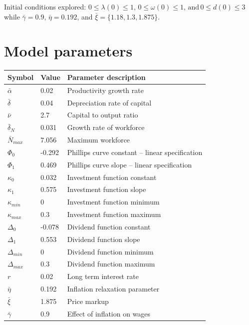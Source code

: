 \documentclass{article}[12 pt]
\begin{document}


Initial conditions explored: $0 \leq \lambda(0) \leq 1, \, 0 \leq \omega(0) \leq 1, \, \text{and} \, 0 \leq d(0) \leq 3$ while $\bar \gamma =0.9$, $\bar \eta = 0.192$, and $\bar \xi = \{ 1.18, 1.3, 1.875\}$.



\section{Model parameters}
\begin{tabular}{ l l l } 
\hline
Symbol & Value & Parameter description \\
\hline
$\bar \alpha$ & 0.02 & Productivity growth rate  \\ 
$\bar \delta$ & 0.04 & Depreciation rate of capital \\
$\bar \nu$ & 2.7  & Capital to output ratio \\
$\bar \delta_N $ & 0.031 & Growth rate of workforce\\
$ \bar N_{max} $ & 7.056 & Maximum workforce \\
$\Phi_0$ & -0.292 & Phillips curve constant -- linear specification \\
$\Phi_1$ & 0.469 & Phillips curve slope -- linear specification \\
$\kappa_0$ & 0.032 & Investment function constant \\
$\kappa_1$ & 0.575 & Investment  function slope \\
$\kappa_{min}$ & 0  & Investment  function minimum \\
$\kappa_{max}$ & 0.3 & Investment  function maximum \\
$\Delta_0$ & -0.078 & Dividend function constant \\
$\Delta_1$ & 0.553 & Dividend function slope \\
$\Delta_{min}$ & 0  & Dividend function minimum \\
$\Delta_{max}$ & 0.3 & Dividend function maximum \\
$r$ & 0.02 & Long term interest rate \\
$\bar \eta$  & 0.192 & Inflation relaxation parameter\\
$\bar \xi$ & 1.875 & Price markup \\
$\bar \gamma$ & 0.9 & Effect of inflation on wages \\

\end{tabular}
\end{document}
